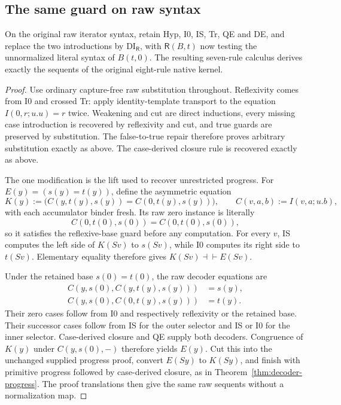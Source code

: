 \subsection{The same guard on raw syntax}

\begin{proposition}
On the original raw iterator syntax, retain Hyp, I0, IS, Tr, QE and DE,
and replace the two introductions by $\mathrm{DI}_{\mathsf R}$, with
$\mathsf R(B,t)$ now testing the unnormalized literal syntax of
$B(t,0)$.  The resulting seven-rule calculus derives exactly the
sequents of the original eight-rule native kernel.
\end{proposition}
\begin{proof}
Use ordinary capture-free raw substitution throughout.  Reflexivity
comes from I0 and crossed Tr: apply identity-template transport to the
equation $I(0,r;u.u)=r$ twice.  Weakening and cut are direct inductions,
every missing case introduction is recovered by reflexivity and cut,
and true guards are preserved by substitution.  The false-to-true repair
therefore proves arbitrary substitution exactly as above.  The case-derived closure rule is recovered exactly as above.

The one modification is the lift used to recover unrestricted progress.
For $E(y)=(s(y)=t(y))$, define the asymmetric equation
\[
 K(y):=
 \bigl(C(y,t(y),s(y))=C(0,t(y),s(y))\bigr),
 \qquad C(v,a,b):=I(v,a;u.b),
\]
with each accumulator binder fresh.  Its raw zero instance is literally
\[
 C(0,t(0),s(0))=C(0,t(0),s(0)),
\]
so it satisfies the reflexive-base guard before any computation.
For every $v$, IS computes the left side of $K(Sv)$ to $s(Sv)$,
while I0 computes its right side to $t(Sv)$.  Elementary equality
therefore gives $K(Sv)\dashv\vdash E(Sv)$.

Under the retained base $s(0)=t(0)$, the raw decoder equations are
\begin{align*}
 C(y,s(0),C(y,t(y),s(y)))&=s(y),\\
 C(y,s(0),C(0,t(y),s(y)))&=t(y).
\end{align*}
Their zero cases follow from I0 and respectively reflexivity or the retained
base.  Their successor cases follow from IS for the outer selector and
IS or I0 for the inner selector.  Case-derived closure and QE supply both
decoders.  Congruence of $K(y)$ under $C(y,s(0),-)$ therefore yields $E(y)$.
Cut this into the unchanged supplied progress proof, convert $E(Sy)$
to $K(Sy)$, and finish with primitive progress followed by case-derived
closure, as in Theorem~\ref{thm:decoder-progress}.  The proof translations
then give the same raw sequents without a normalization map.
\end{proof}


